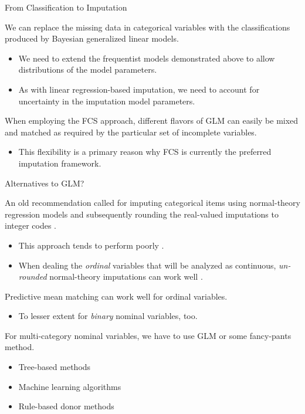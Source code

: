 \documentclass{beamer}\usepackage[]{graphicx}\usepackage[]{color}
\begin{document}

\begin{frame}{From Classification to Imputation}
  
  We can replace the missing data in categorical variables with the 
  classifications produced by Bayesian generalized linear models.
  \vc
  \begin{itemize}
  \item We need to extend the frequentist models demonstrated above to allow 
    distributions of the model parameters.
    \vc
  \item As with linear regression-based imputation, we need to account for 
    uncertainty in the imputation model parameters.
  \end{itemize}
  \vb
  \pause
  When employing the FCS approach, different flavors of GLM can easily be mixed 
  and matched as required by the particular set of incomplete variables.
  \vc
  \begin{itemize}
  \item This flexibility is a primary reason why FCS is currently the preferred 
    imputation framework.
  \end{itemize}
  
\end{frame}


\begin{frame}[allowframebreaks]{Alternatives to GLM?}
  
  An old recommendation called for imputing categorical items using 
  normal-theory regression models and subsequently rounding the real-valued 
  imputations to integer codes \citep{allison:2002, honakerKing:2010}.
  \vc
  \begin{itemize}
  \item This approach tends to perform poorly \citep{langWu:2017}.
    \vc
  \item When dealing the \emph{ordinal} variables that will be analyzed as 
    continuous, \emph{un-rounded} normal-theory imputations can work well 
    \citep{wuEtAl:2015}.
  \end{itemize}
  
  \pagebreak
  
  Predictive mean matching can work well for ordinal variables.
  \begin{itemize}
  \item To lesser extent for \emph{binary} nominal variables, too.
  \end{itemize}
  \vb
  For multi-category nominal variables, we have to use GLM or some fancy-pants 
  method.
  \begin{itemize}
  \item Tree-based methods
  \item Machine learning algorithms
  \item Rule-based donor methods
  \end{itemize}
  
\end{frame}
\end{document}
